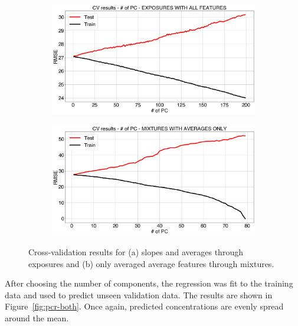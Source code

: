 \begin{figure}[!htb]
	\centering
	
	\begin{subfigure}[t]{0.5\textwidth}
		\includegraphics[width=1\linewidth]{../figures/pcr-cv.png}
		\caption{}
		\label{fig:pcr-cv} 
	\end{subfigure}
	
	\begin{subfigure}[t]{0.5\textwidth}
		\includegraphics[width=1\linewidth]{../figures/pcr-cv-avg-feat.png}
		\caption{}
		\label{fig:pcr-cv-averaged}
	\end{subfigure}
	
	\caption{Cross-validation results for (a) slopes and averages through exposures and (b) only averaged average features through mixtures.}
	\label{fig:pcr-cv-both}
\end{figure}

After choosing the number of components, the regression was fit to the training data and used to predict unseen validation data. The results are shown in Figure~\ref{fig:pcr-both}. Once again, predicted concentrations are evenly spread around the mean.

